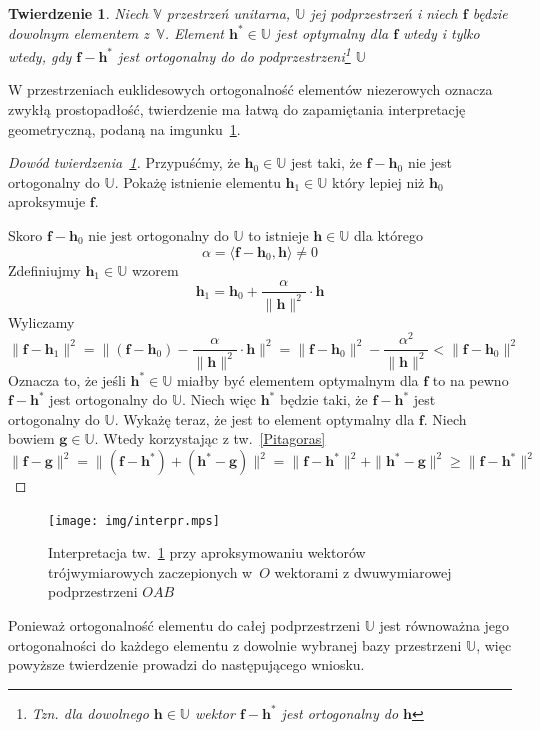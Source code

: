 \documentclass[12pt]{mwbk}
\theoremstyle{plain}
\newtheorem{twier}{Twierdzenie}[chapter] %
\theoremstyle{definition}
\theoremstyle{remark}
\newcommand{\ff}{\mathbf{f}}
\newcommand{\hh}{\mathbf{h}}
\newcommand{\gggg}{\mathbf{g}}
\newcommand{\skalar}[2]{\pmb{\langle}#1,#2\pmb{\rangle}}
\begin{document}
\begin{twier}\label{podst_tw_unit}
	Niech $\mathbb{V}$ przestrzeń unitarna, $\mathbb{U}$ jej
	podprzestrzeń i niech $\ff$ będzie dowolnym elementem
	z~$\mathbb{V}$. Element $\hh^*\in\mathbb{U}$ jest optymalny
	dla $\ff$ wtedy i tylko wtedy, gdy $\ff-\hh^*$ jest ortogonalny do
	do podprzestrzeni\footnote{Tzn. dla dowolnego $\hh\in\mathbb{U}$
	wektor $\ff-\hh^*$ jest ortogonalny do $\hh$} $\mathbb{U}$
\end{twier}

W przestrzeniach euklidesowych ortogonalność elementów
niezerowych oznacza zwykłą prostopadłość, twierdzenie ma łatwą do
zapamiętania interpretację geometryczną, podaną na
imgunku~\ref{fig:interp_prost}.

\begin{proof}[Dowód twierdzenia~\ref{podst_tw_unit}]
	Przypuśćmy, że $\hh_0\in\mathbb{U}$ jest taki, że $\ff-\hh_0$ nie
	jest ortogonalny do $\mathbb{U}$. Pokażę istnienie elementu
	$\hh_1\in\mathbb{U}$ który lepiej niż $\hh_0$ aproksymuje $\ff$.
	
	Skoro $\ff-\hh_0$ nie jest ortogonalny do $\mathbb{U}$ to istnieje
	$\hh\in\mathbb{U}$ dla którego
	\[
	\alpha=\skalar{\ff-\hh_0}{\hh}\ne0
	\]
	Zdefiniujmy $\hh_1\in\mathbb{U}$ wzorem
	\[
	\hh_1=\hh_0+\frac{\alpha}{\|\hh\|^2}\cdot \hh
	\]
	Wyliczamy
	\[
	\|\ff-\hh_1\|^2=
	\|(\ff-\hh_0)-\frac{\alpha}{\|\hh\|^2}\cdot\hh\|^2=
	\|\ff-\hh_0\|^2-\frac{\alpha^2}{\|\hh\|^2}<\|\ff-\hh_0\|^2
	\]
	Oznacza to, że jeśli $\hh^*\in\mathbb{U}$ miałby być elementem
	optymalnym dla $\ff$ to na pewno $\ff-\hh^*$ jest ortogonalny
	do $\mathbb{U}$. Niech więc $\hh^*$ będzie taki, że
	$\ff-\hh^*$ jest ortogonalny do $\mathbb{U}$. Wykażę teraz, że
	jest to element optymalny dla $\ff$. Niech bowiem
	$\gggg\in\mathbb{U}$. Wtedy korzystając z tw.~\ref{Pitagoras}
	\[
	\|\ff-\gggg\|^2=\|(\ff-\hh^*)+(\hh^*-\gggg)\|^2=
	\|\ff-\hh^*\|^2+\|\hh^*-\gggg\|^2\geq
	\|\ff-\hh^*\|^2
\]
\end{proof}

\begin{figure}[htbp]
	\centering
		\texttt{[image: img/interpr.mps]}
	\caption{Interpretacja tw.~\ref{podst_tw_unit} przy
	aproksymowaniu wektorów trójwymiarowych zaczepionych w~$O$
	wektorami z dwuwymiarowej podprzestrzeni $O A B$}
	\label{fig:interp_prost}
\end{figure}



Ponieważ ortogonalność elementu do całej podprzestrzeni $\mathbb{U}$
jest równoważna jego ortogonalności do każdego elementu z dowolnie
wybranej bazy przestrzeni $\mathbb{U}$, więc powyższe twierdzenie
prowadzi do następującego wniosku.
\end{document}
